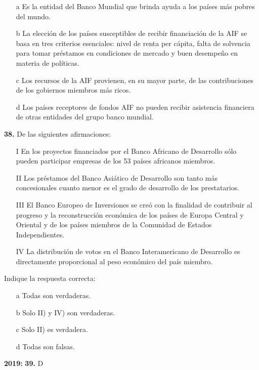 \documentclass{nuevotema}
\begin{document}
\begin{itemize}
	\item[a] Es la entidad del Banco Mundial que brinda ayuda a los países más pobres del mundo.
	\item[b] La elección de los países susceptibles de recibir financiación de la AIF se basa en tres criterios esenciales: nivel de renta per cápita, falta de solvencia para tomar préstamos en condiciones de mercado y buen desempeño en materia de políticas.
	\item[c] Los recursos de la AIF provienen, en su mayor parte, de las contribuciones de los gobiernos miembros más ricos.
	\item[d] Los países receptores de fondos AIF no pueden recibir asistencia financiera de otras entidades del grupo banco mundial.
\end{itemize}

\textbf{38.} De las siguientes afirmaciones:

\begin{itemize}
	\item[I] En los proyectos financiados por el Banco Africano de Desarrollo sólo pueden participar empresas de los 53 países africanos miembros.
	\item[II] Los préstamos del Banco Asiático de Desarrollo son tanto más concesionales cuanto menor es el grado de desarrollo de los prestatarios.
	\item[III] El Banco Europeo de Inversiones se creó con la finalidad de contribuir al progreso y la reconstrucción económica de los países de Europa Central y Oriental y de los países miembros de la Comunidad de Estados Independientes.
	\item[IV] La distribución de votos en el Banco Interamericano de Desarrollo es directamente proporcional al peso económico del país miembro.
\end{itemize}

Indique la respuesta correcta:

\begin{itemize}
	\item[a] Todas son verdaderas.
	\item[b] Solo II) y IV) son verdaderas.
	\item[c] Solo II) es verdadera.
	\item[d] Todas son falsas.
\end{itemize}

\notas

\textbf{2019:} \textbf{39.} D
\end{document}
